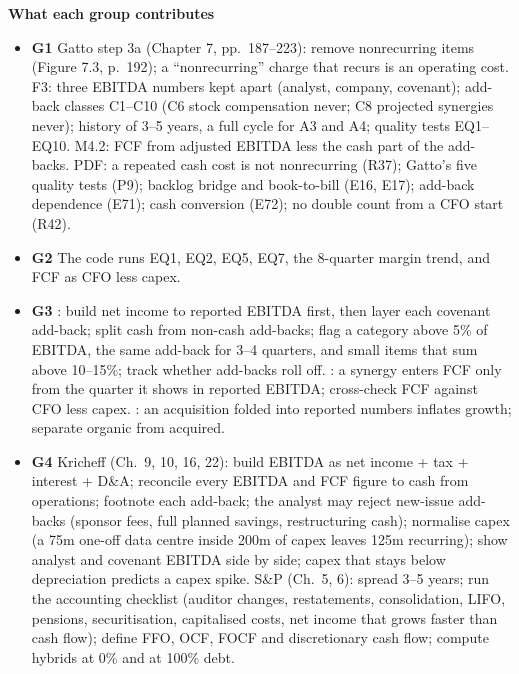 \documentclass[11pt]{article}
\newcommand{\GA}{\textcolor{gA}{\textbf{G1}}}
\newcommand{\GB}{\textcolor{gB}{\textbf{G2}}}
\newcommand{\GC}{\textcolor{gC}{\textbf{G3}}}
\newcommand{\GD}{\textcolor{gD}{\textbf{G4}}}
\newcommand{\fld}[1]{\par\medskip\noindent\textbf{\textcolor{steel}{#1}}\par\nopagebreak}
\begin{document}
\fld{What each group contributes}
\begin{itemize}
\item \GA{} Gatto step 3a (Chapter 7, pp.~187--223): remove nonrecurring items (Figure 7.3, p.~192); a ``nonrecurring'' charge that recurs is an operating cost. F3: three EBITDA numbers kept apart (analyst, company, covenant); add-back classes C1--C10 (C6 stock compensation never; C8 projected synergies never); history of 3--5 years, a full cycle for A3 and A4; quality tests EQ1--EQ10. M4.2: FCF from adjusted EBITDA less the cash part of the add-backs. PDF: a repeated cash cost is not nonrecurring (R37); Gatto's five quality tests (P9); backlog bridge and book-to-bill (E16, E17); add-back dependence (E71); cash conversion (E72); no double count from a CFO start (R42).
\item \GB{} The code runs EQ1, EQ2, EQ5, EQ7, the 8-quarter margin trend, and FCF as CFO less capex.
\item \GC{} : build net income to reported EBITDA first, then layer each covenant add-back; split cash from non-cash add-backs; flag a category above 5\% of EBITDA, the same add-back for 3--4 quarters, and small items that sum above 10--15\%; track whether add-backs roll off. : a synergy enters FCF only from the quarter it shows in reported EBITDA; cross-check FCF against CFO less capex. : an acquisition folded into reported numbers inflates growth; separate organic from acquired.
\item \GD{} Kricheff (Ch.~9, 10, 16, 22): build EBITDA as net income + tax + interest + D\&A; reconcile every EBITDA and FCF figure to cash from operations; footnote each add-back; the analyst may reject new-issue add-backs (sponsor fees, full planned savings, restructuring cash); normalise capex (a 75m one-off data centre inside 200m of capex leaves 125m recurring); show analyst and covenant EBITDA side by side; capex that stays below depreciation predicts a capex spike. S\&P (Ch.~5, 6): spread 3--5 years; run the accounting checklist (auditor changes, restatements, consolidation, LIFO, pensions, securitisation, capitalised costs, net income that grows faster than cash flow); define FFO, OCF, FOCF and discretionary cash flow; compute hybrids at 0\% and at 100\% debt.
\end{itemize}
\end{document}
